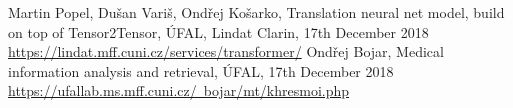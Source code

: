 \documentclass[a4paper]{article}
\begin{document}
\vspace*{\fill}

\begin{thebibliography}{1}
  Martin Popel, Dušan Variš, Ondřej Košarko,
  Translation neural net model, build on top of Tensor2Tensor,
  ÚFAL, Lindat Clarin,
  17th December 2018
  \href{https://lindat.mff.cuni.cz/services/transformer/}{https://lindat.mff.cuni.cz/services/transformer/}
  Ondřej Bojar,
  Medical information analysis and retrieval,
  ÚFAL,
  17th December 2018
  \href{https://ufallab.ms.mff.cuni.cz/~bojar/mt/khresmoi.php}{https://ufallab.ms.mff.cuni.cz/~bojar/mt/khresmoi.php}
\end{thebibliography}
\end{document}
